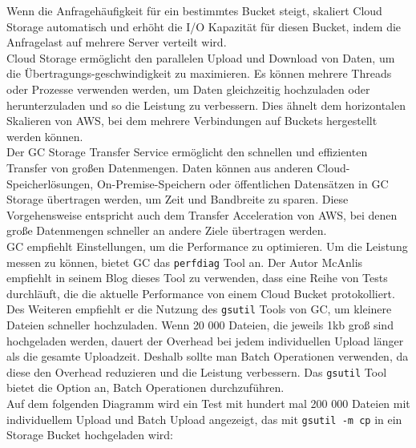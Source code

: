  Wenn die Anfragehäufigkeit für ein bestimmtes Bucket steigt, skaliert Cloud Storage automatisch und erhöht die I/O Kapazität für diesen Bucket, indem die Anfragelast auf mehrere Server verteilt wird.\\
 
Cloud Storage ermöglicht den parallelen Upload und Download von Daten, um die Übertragungs-geschwindigkeit zu maximieren. Es können mehrere Threads oder Prozesse verwenden werden, um Daten gleichzeitig hochzuladen oder herunterzuladen und so die Leistung zu verbessern. Dies ähnelt dem horizontalen Skalieren von AWS, bei dem mehrere Verbindungen auf Buckets hergestellt werden können.\\

Der GC Storage Transfer Service ermöglicht den schnellen und effizienten Transfer von großen Datenmengen. Daten können aus anderen Cloud-Speicherlösungen, On-Premise-Speichern oder öffentlichen Datensätzen in GC Storage übertragen werden, um Zeit und Bandbreite zu sparen. Diese Vorgehensweise entspricht auch dem Transfer Acceleration von AWS, bei denen große Datenmengen schneller an andere Ziele übertragen werden.\\

GC empfiehlt Einstellungen, um die Performance zu optimieren. Um die Leistung messen zu können, bietet GC das \verb|perfdiag| Tool an. Der Autor McAnlis empfiehlt in seinem Blog  dieses Tool zu verwenden, dass eine Reihe von Tests durchläuft, die die aktuelle Performance von einem Cloud Bucket protokolliert. Des Weiteren empfiehlt er die Nutzung des \verb|gsutil| Tools von GC, um kleinere Dateien schneller hochzuladen. Wenn 20 000 Dateien, die jeweils 1kb groß sind hochgeladen werden, dauert der Overhead bei jedem individuellen Upload länger als die gesamte Uploadzeit. Deshalb sollte man Batch Operationen verwenden, da diese den Overhead reduzieren und die Leistung verbessern. Das \verb|gsutil| Tool bietet die Option an, Batch Operationen durchzuführen.\\ 

Auf dem folgenden Diagramm wird ein Test mit hundert mal 200 000 Dateien mit individuellem Upload und Batch Upload angezeigt, das mit \verb|gsutil -m cp| in ein Storage Bucket hochgeladen wird:

